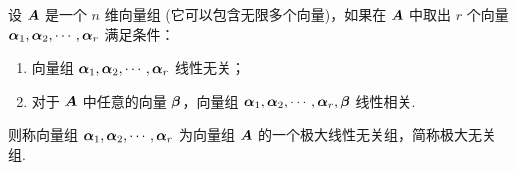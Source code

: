 \begin{definition}[极大线性无关组]
    设 $\vb*{A}$ 是一个 $n$ 维向量组 (它可以包含无限多个向量)，如果在 $\vb*{A}$ 中取出 $r$ 个向量 $\vb*{\alpha}_1,\vb*{\alpha}_2,\cdots,\vb*{\alpha}_r$ 满足条件：
    \begin{enumerate}[label=(\arabic{*})]
        \item 向量组 $\vb*{\alpha}_1,\vb*{\alpha}_2,\cdots,\vb*{\alpha}_r$ 线性无关；
        \item 对于 $\vb*{A}$ 中任意的向量 $\vb*{\beta}$，向量组 $\vb*{\alpha}_1,\vb*{\alpha}_2,\cdots,\vb*{\alpha}_r,\vb*{\beta}$ 线性相关.
    \end{enumerate}
    则称向量组 $\vb*{\alpha}_1,\vb*{\alpha}_2,\cdots,\vb*{\alpha}_r$ 为向量组 $\vb*{A}$ 的一个极大线性无关组，简称极大无关组.
\end{definition}

